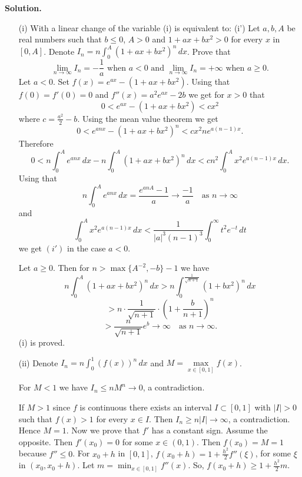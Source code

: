 \documentclass{article}
\begin{document}
\textbf{Solution.}
\begin{itemize}
    \item[(i)] With a linear change of the variable (i) is equivalent to:
    (i') Let \( a, b, A \) be real numbers such that \( b \leq 0 \), \( A > 0 \) and \( 1+ax+bx^2 > 0 \) for every \( x \) in \( [0,A] \). Denote \( I_n = n \int_{0}^{A} (1 + ax + bx^2)^n \, dx \). Prove that
    \[
    \lim_{n \to \infty} I_n = -\frac{1}{a} \text{ when } a < 0 \text{ and } \lim_{n \to \infty} I_n = +\infty \text{ when } a \geq 0.
    \]
    Let \( a < 0 \). Set \( f(x) = e^{ax} - (1 + ax + bx^2) \). Using that \( f(0) = f'(0) = 0 \) and \( f''(x) = a^2e^{ax} - 2b \) we get for \( x > 0 \) that
    \[
    0 < e^{ax} - (1 + ax + bx^2) < cx^2
    \]
    where \( c = \frac{a^2}{2} - b \). Using the mean value theorem we get
    \[
    0 < e^{anx} - (1 + ax + bx^2)^n < cx^2ne^{a(n-1)x}.
    \]
    Therefore
    \[
    0 < n \int_{0}^{A} e^{anx}\,dx - n \int_{0}^{A} (1 + ax + bx^2)^n\,dx < cn^2 \int_{0}^{A} x^2e^{a(n-1)x}\,dx.
    \]
    Using that
    \[
    n \int_{0}^{A} e^{anx}\,dx = \frac{e^{anA} - 1}{a} \rightarrow \frac{-1}{a} \quad \text{as } n \to \infty
    \]
    and
    \[
    \int_{0}^{A} x^2e^{a(n-1)x}\,dx < \frac{1}{\lvert a \rvert^3(n - 1)^3} \int_{0}^{\infty} t^2e^{-t}\,dt
    \]
    we get \( (i') \) in the case \( a < 0 \).

    Let \( a \geq 0 \). Then for \( n > \max\{A^{-2}, -b\} - 1 \) we have
    \[
    n \int_{0}^{A} (1 + ax + bx^2)^n \, dx > n \int_{0}^{\frac{1}{\sqrt{n+1}}} (1 + bx^2)^n \, dx
    \]
    \[
    > n \cdot \frac{1}{\sqrt{n+1}} \cdot \left(1 + \frac{b}{n+1}\right)^n
    \]
    \[
    > \frac{n}{\sqrt{n+1}} e^b \rightarrow \infty \quad \text{as } n \to \infty.
    \]
    (i) is proved.

    \item[(ii)] Denote \( I_n = n \int_{0}^{1} (f(x))^n \, dx \)
    and \( M = \max\limits_{x \in [0,1]} f(x) \).

    For \( M < 1 \) we have \( I_n \leq nM^n \rightarrow 0 \), a contradiction.

    If \( M > 1 \) since \( f \) is continuous there exists an interval
    \( I \subset [0,1] \) with \( |I| > 0 \) such that \( f(x) > 1 \)
    for every \( x \in I \). Then \( I_n \geq n|I| \rightarrow \infty \),
    a contradiction. Hence \( M = 1 \). Now we prove that \( f' \) has a constant
    sign. Assume the opposite. Then \( f'(x_0) = 0 \) for some \( x \in (0,1) \).
    Then \( f(x_0) = M = 1 \) because \( f'' \leq 0 \).
    For \( x_0 + h \) in \([0,1]\), \( f(x_0 + h) = 1 + \frac{h^2}{2} f''(\xi) \),
    for some \( \xi \) in \( (x_0, x_0 + h) \).
    Let \( m = \min_{x \in [0,1]} f''(x) \). So, \( f(x_0 + h) \geq 1 + \frac{h^2}{2} m \).


\end{itemize}
\end{document}

